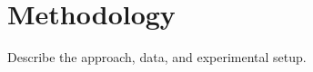 \section{Methodology}
\label{sec:methodology}

Describe the approach, data, and experimental setup.
